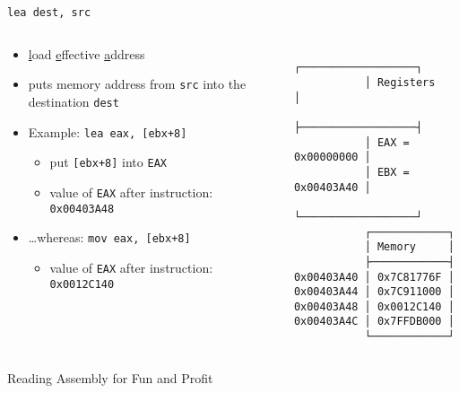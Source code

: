 \begin{frame}[fragile]{\texttt{lea dest, src}}
    \begin{columns}
        \begin{column}{.5\textwidth}
            \begin{itemize}
                \item \underline{l}oad \underline{e}ffective \underline{a}ddress
                \item puts memory address from \texttt{src} into the destination \texttt{dest}
                \item Example: \texttt{lea eax, [ebx+8]}
                \begin{itemize}
                    \item put \texttt{[ebx+8]} into \texttt{EAX}
                    \item value of \texttt{EAX} after instruction: \texttt{0x00403A48}
                \end{itemize}
                \item \ldots whereas: \texttt{mov eax, [ebx+8]}
                \begin{itemize}
                    \item value of \texttt{EAX} after instruction: \texttt{0x0012C140}
                \end{itemize}
            \end{itemize}
        \end{column}
        \begin{column}{.5\textwidth}
            \begin{Verbatim}
           ┌──────────────────┐
           │ Registers        │
           ├──────────────────┤
           │ EAX = 0x00000000 │ 
           │ EBX = 0x00403A40 │ 
           └──────────────────┘
           ┌────────────┐
           │ Memory     │
           ├────────────┤
0x00403A40 │ 0x7C81776F │ 
0x00403A44 │ 0x7C911000 │ 
0x00403A48 │ 0x0012C140 │ 
0x00403A4C │ 0x7FFDB000 │ 
           └────────────┘
            \end{Verbatim}
        \end{column}
    \end{columns}
\end{frame}

\begin{frame}[fragile]{Reading Assembly for Fun and Profit}
    \begin{columns}[t]
        \begin{column}{.45\textwidth}
            
        \end{column}
        \begin{column}{.45\textwidth}
        \end{column}
    \end{columns}
\end{frame}

